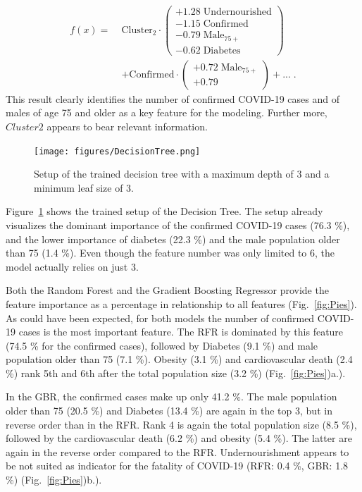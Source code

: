 \documentclass[a4paper, 11pt]{article} %
\begin{document}
\begin{align}
f(x) = \; & \text{Cluster}_2 \cdot \begin{pmatrix} +1.28 \;\text{Undernourished} \\\nonumber
-1.15\;\text{Confirmed}\\
-0.79\;\text{Male}_{75+}\\
-0.62\;\text{Diabetes}\end{pmatrix}\\
&+\text{Confirmed}\cdot\begin{pmatrix}+0.72\;\text{Male}_{75+}\\ +0.79\end{pmatrix} + ... \; .
\label{eq:Poly_fit}
\end{align}
This result clearly identifies the number of confirmed COVID-19 cases and of males of age 75 and older as a key feature for the modeling. Further more, $Cluster 2$ appears to bear relevant information.

\begin{figure}[htbp]
\centering 
   \texttt{[image: figures/DecisionTree.png]} 
   \caption{Setup of the trained decision tree with a maximum depth of 3 and a minimum leaf size of 3.}
   \label{fig:DT}
\end{figure}
Figure~\ref{fig:DT} shows the trained setup of the Decision Tree. The setup already visualizes the dominant importance of the confirmed COVID-19 cases (76.3 \%), and the lower importance of diabetes (22.3 \%) and the male population older than 75 (1.4 \%). Even though the feature number was only limited to 6, the model actually relies on just 3.


Both the Random Forest and the Gradient Boosting Regressor provide the feature importance as a percentage in relationship to all features (Fig.~\ref{fig:Pies}). As could have been expected, for both models the number of confirmed COVID-19 cases is the most important feature. The RFR is dominated by this feature (74.5 \% for the confirmed cases), followed by Diabetes (9.1 \%) and male population older than 75 (7.1 \%). Obesity (3.1 \%) and cardiovascular death (2.4 \%) rank 5th and 6th after the total population size (3.2 \%) (Fig.~\ref{fig:Pies})a.). 

In the GBR, the confirmed cases make up only 41.2 \%. The male population older than 75 (20.5 \%) and Diabetes (13.4 \%) are again in the top 3, but in reverse order than in the RFR. Rank 4 is again the total population size (8.5 \%), followed by the cardiovascular death (6.2 \%) and obesity (5.4 \%). The latter are again in the reverse order compared to the RFR. Undernourishment appears to be not suited as indicator for the fatality of COVID-19 (RFR: 0.4 \%, GBR: 1.8 \%) (Fig.~\ref{fig:Pies})b.).
\end{document}

